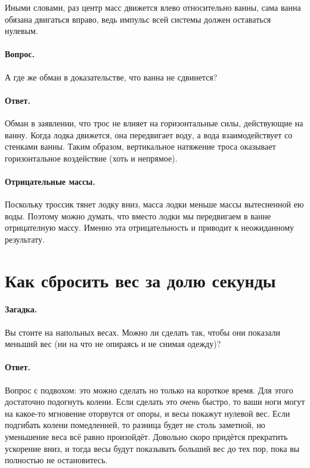 Иными словами, раз центр масс движется влево относительно ванны, сама ванна обязана двигаться вправо, ведь импульс всей системы должен оставаться нулевым.

\paragraph{Вопрос.}
А где же обман в доказательстве, что ванна не сдвинется?

\paragraph{Ответ.}
Обман в заявлении, что трос не влияет на горизонтальные силы, действующие на ванну.
Когда лодка движется, она передвигает воду, а вода взаимодействует со стенками ванны.
Таким образом, вертикальное натяжение троса оказывает горизонтальное воздействие (хоть и непрямое).

\paragraph{Отрицательные массы.}
Поскольку троссик тянет лодку вниз, масса лодки меньше массы вытесненной ею воды.
Поэтому можно думать, что вместо лодки мы передвигаем в ванне отрицателную массу.
Именно эта отрицательность и приводит к неожиданному результату.

\section{Как сбросить вес за долю секунды}

\paragraph{Загадка.}
Вы стоите на напольных весах.
Можно ли сделать так, чтобы они показали меньший вес (ни на что не опираясь и не снимая одежду)?

\paragraph{Ответ.} Вопрос с подвохом: это можно сделать но только на короткое время.
Для этого достаточно подогнуть колени.
Если сделать это \emph{очень} быстро, то ваши ноги могут на какое-то мгновение оторвутся от опоры, и весы покажут нулевой вес.
Если подгибать колени помедленней, то разница будет не столь заметной, но уменьшение веса всё равно произойдёт.
Довольно скоро придётся прекратить ускорение вниз, и тогда весы будут показывать больший вес до тех пор, пока вы полностью не остановитесь.

